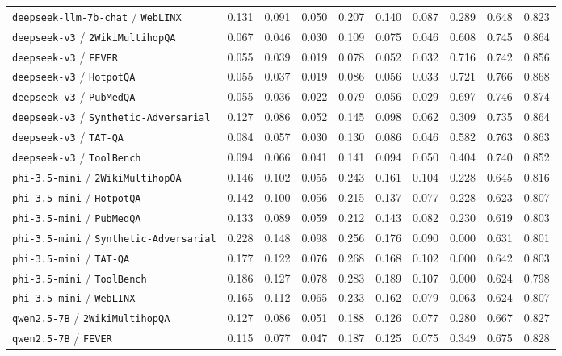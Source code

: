 \begin{longtable}{lccccccccc}
\texttt{deepseek-llm-7b-chat} / \texttt{WebLINX} & 0.131 & 0.091 & 0.050 & 0.207 & 0.140 & 0.087 & 0.289 & 0.648 & 0.823 \\
\texttt{deepseek-v3} / \texttt{2WikiMultihopQA} & 0.067 & 0.046 & 0.030 & 0.109 & 0.075 & 0.046 & 0.608 & 0.745 & 0.864 \\
\texttt{deepseek-v3} / \texttt{FEVER} & 0.055 & 0.039 & 0.019 & 0.078 & 0.052 & 0.032 & 0.716 & 0.742 & 0.856 \\
\texttt{deepseek-v3} / \texttt{HotpotQA} & 0.055 & 0.037 & 0.019 & 0.086 & 0.056 & 0.033 & 0.721 & 0.766 & 0.868 \\
\texttt{deepseek-v3} / \texttt{PubMedQA} & 0.055 & 0.036 & 0.022 & 0.079 & 0.056 & 0.029 & 0.697 & 0.746 & 0.874 \\
\texttt{deepseek-v3} / \texttt{Synthetic-Adversarial} & 0.127 & 0.086 & 0.052 & 0.145 & 0.098 & 0.062 & 0.309 & 0.735 & 0.864 \\
\texttt{deepseek-v3} / \texttt{TAT-QA} & 0.084 & 0.057 & 0.030 & 0.130 & 0.086 & 0.046 & 0.582 & 0.763 & 0.863 \\
\texttt{deepseek-v3} / \texttt{ToolBench} & 0.094 & 0.066 & 0.041 & 0.141 & 0.094 & 0.050 & 0.404 & 0.740 & 0.852 \\
\texttt{phi-3.5-mini} / \texttt{2WikiMultihopQA} & 0.146 & 0.102 & 0.055 & 0.243 & 0.161 & 0.104 & 0.228 & 0.645 & 0.816 \\
\texttt{phi-3.5-mini} / \texttt{HotpotQA} & 0.142 & 0.100 & 0.056 & 0.215 & 0.137 & 0.077 & 0.228 & 0.623 & 0.807 \\
\texttt{phi-3.5-mini} / \texttt{PubMedQA} & 0.133 & 0.089 & 0.059 & 0.212 & 0.143 & 0.082 & 0.230 & 0.619 & 0.803 \\
\texttt{phi-3.5-mini} / \texttt{Synthetic-Adversarial} & 0.228 & 0.148 & 0.098 & 0.256 & 0.176 & 0.090 & 0.000 & 0.631 & 0.801 \\
\texttt{phi-3.5-mini} / \texttt{TAT-QA} & 0.177 & 0.122 & 0.076 & 0.268 & 0.168 & 0.102 & 0.000 & 0.642 & 0.803 \\
\texttt{phi-3.5-mini} / \texttt{ToolBench} & 0.186 & 0.127 & 0.078 & 0.283 & 0.189 & 0.107 & 0.000 & 0.624 & 0.798 \\
\texttt{phi-3.5-mini} / \texttt{WebLINX} & 0.165 & 0.112 & 0.065 & 0.233 & 0.162 & 0.079 & 0.063 & 0.624 & 0.807 \\
\texttt{qwen2.5-7B} / \texttt{2WikiMultihopQA} & 0.127 & 0.086 & 0.051 & 0.188 & 0.126 & 0.077 & 0.280 & 0.667 & 0.827 \\
\texttt{qwen2.5-7B} / \texttt{FEVER} & 0.115 & 0.077 & 0.047 & 0.187 & 0.125 & 0.075 & 0.349 & 0.675 & 0.828 \\

\end{longtable}

